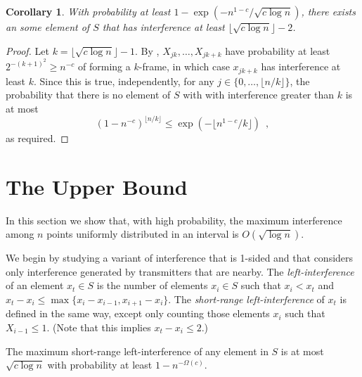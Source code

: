 \documentclass{patmorin}
\newtheorem{cor}{Corollary}
\begin{document}
\begin{cor}
With probability at least $1-\exp(-n^{1-c}/\sqrt{c\log n})$, there exists an some
element of $S$ that has interference at least $\lfloor\sqrt{c\log n}\rfloor-2$.
\end{cor}

\begin{proof}
Let $k=\lfloor \sqrt{c\log n} \rfloor-1$.  By ,
$X_{jk},\ldots,X_{jk+k}$ have probability at least $2^{-(k+1)^2}\ge
n^{-c}$ of forming a $k$-frame, in which case $x_{jk+k}$ has
interference at least $k$.  Since this is true, independently, for any
$j\in\{0,\ldots,\lfloor n/k\rfloor\}$, the probability that there is no
element of $S$ with with interference greater than $k$ is at most
\[
   (1-n^{-c})^{\lfloor n/k\rfloor} \le \exp(-\lfloor n^{1-c}/k\rfloor) \enspace ,
\]
as required.
\end{proof}


\section{The Upper Bound}

In this section we show that, with high probability, the maximum
interference among $n$ points uniformly distributed in an interval is
$O(\sqrt{\log n})$.

We begin by studying a variant of interference that is 1-sided and
that considers only interference generated by transmitters that
are nearby.  The \emph{left-interference} of an element $x_t\in
S$ is the number of elements $x_i\in S$ such that $x_i < x_t$ and
$x_t-x_i \le \max\{x_i-x_{i-1},x_{i+1}-x_i\}$.  The \emph{short-range
left-interference} of $x_t$ is defined in the same way, except only
counting those elements $x_i$ such that $X_{i-1} \le 1$. (Note that this
implies $x_t-x_i \le 2$.)

\begin{lem}
The maximum short-range left-interference of any element in $S$ is at
most $\sqrt{c\log n}$ with probability at least $1-n^{-\Omega(c)}$.
\end{lem}
\end{document}
